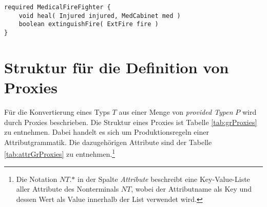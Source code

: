 \documentclass[a4paper,12pt]{article}
\begin{document}
\begin{lstlisting}[caption={Bibliothek \emph{ExampLe} von Typen},captionpos=b, style = dsl]
required MedicalFireFighter {
	void heal( Injured injured, MedCabinet med )
	boolean extinguishFire( ExtFire fire )	
}
\end{lstlisting}\label{lst:libEx}

\newpage

\section{Struktur für die Definition von Proxies}\label{sec:proxygram}
Für die Konvertierung eines Typs $T$ aus einer Menge von \emph{provided Typen} $P$ wird durch Proxies beschrieben. Die Struktur eines Proxies ist Tabelle \ref{tab:grProxies} zu entnehmen. Dabei handelt es sich um Produktionsregeln einer Attributgrammatik. Die dazugehörigen Attribute sind der Tabelle \ref{tab:attrGrProxies} zu entnehmen.\footnote{Die Notation $\mathit{NT}\texttt{.}\text{*}$ in der Spalte \emph{Attribute} beschreibt eine Key-Value-Liste aller Attribute des Nonterminals $\mathit{NT}$, wobei der Attributname als Key und dessen Wert als Value innerhalb der List verwendet wird.}
\end{document}
